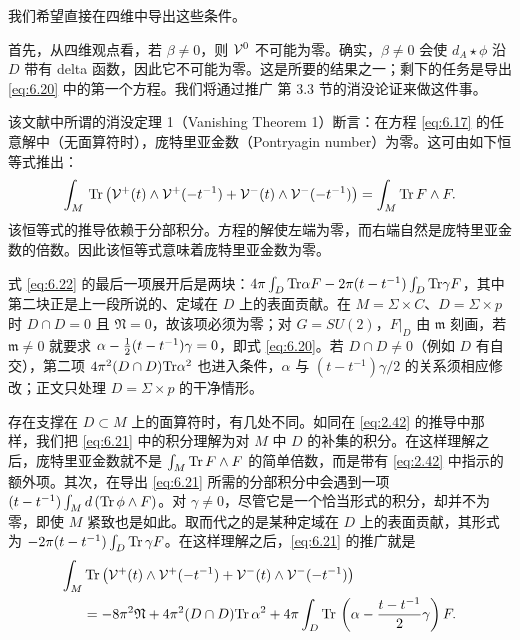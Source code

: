 我们希望直接在四维中导出这些条件。

首先，从四维观点看，若 $\beta\not=0$，则 $\mathcal{V}^0$ 不可能为零。确实，$\beta\not=0$ 会使 $d_A\star\phi$ 沿 $D$ 带有 delta 函数，因此它不可能为零。这是所要的结果之一；剩下的任务是导出 \eqref{eq:6.20} 中的第一个方程。我们将通过推广 \cite{ref8} 第 3.3 节的消没论证来做这件事。

该文献中所谓的消没定理 1（Vanishing Theorem 1）断言：在方程 \eqref{eq:6.17} 的任意解中（无面算符时），庞特里亚金数（Pontryagin number）为零。这可由如下恒等式推出：
\setcounter{equation}{20}
\begin{equation}\label{eq:6.21}
  \int_M\,{\rm Tr}\left(\mathcal{V}^+(t)\wedge
\mathcal{V}^+(-t^{-1})+\mathcal{V}^-(t)\wedge \mathcal{V}^-(-t^{-1})\right)=\int_M{\rm Tr}
\,F\wedge F.
\end{equation}
 该恒等式的推导依赖于分部积分。方程的解使左端为零，而右端自然是庞特里亚金数的倍数。因此该恒等式意味着庞特里亚金数为零。

\begin{yizhu}[含糊点拨]式 \eqref{eq:6.22} 的最后一项展开后是两块：$4\pi\int_D{\rm Tr}\alpha F-2\pi(t-t^{-1})\int_D{\rm Tr}\gamma F$，其中第二块正是上一段所说的、定域在 $D$ 上的表面贡献。在 $M=\Sigma\times C$、$D=\Sigma\times p$ 时 $D\cap D=0$ 且 $\mathfrak N=0$，故该项必须为零；对 $G=SU(2)$，$F|_D$ 由 $\mathfrak m$ 刻画，若 $\mathfrak m\not=0$ 就要求 $\alpha-{1\over 2}(t-t^{-1})\gamma=0$，即式 \eqref{eq:6.20}。若 $D\cap D\not=0$（例如 $D$ 有自交），第二项 $4\pi^2(D\cap D){\rm Tr}\alpha^2$ 也进入条件，$\alpha$ 与 $(t-t^{-1})\gamma/2$ 的关系须相应修改；正文只处理 $D=\Sigma\times p$ 的干净情形。\end{yizhu}


存在支撑在 $D\subset M$ 上的面算符时，有几处不同。如同在 \eqref{eq:2.42} 的推导中那样，我们把 \eqref{eq:6.21} 中的积分理解为对 $M$ 中 $D$ 的补集的积分。在这样理解之后，庞特里亚金数就不是 $\int_M{\rm Tr}\, F \wedge F$ 的简单倍数，而是带有 \eqref{eq:2.42} 中指示的额外项。其次，在导出 \eqref{eq:6.21} 所需的分部积分中会遇到一项 $(t-t^{-1})\int_M d\left({\rm Tr}\,
\phi\wedge F\right)$。对 $\gamma\not= 0$，尽管它是一个恰当形式的积分，却并不为零，即使 $M$ 紧致也是如此。取而代之的是某种定域在 $D$ 上的表面贡献，其形式为 $-2\pi(t-t^{-1})\int_D{\rm Tr}\,\gamma F$。在这样理解之后，\eqref{eq:6.21} 的推广就是
\setcounter{equation}{21}
\begin{equation}\label{eq:6.22}
  \begin{aligned}\int_M &\,{\rm Tr}\left(\mathcal{V}^+(t)\wedge
\mathcal{V}^+(-t^{-1})+\mathcal{V}^-(t)\wedge \mathcal{V}^-(-t^{-1})\right)\\ &
 =-8\pi^2\mathfrak{N}+4\pi^2(D\cap D){\rm Tr}\,\alpha^2
+4\pi\int_D{\rm Tr}\,\left(\alpha-{t-t^{-1}\over 2}\gamma\right)F.\end{aligned}
\end{equation}


